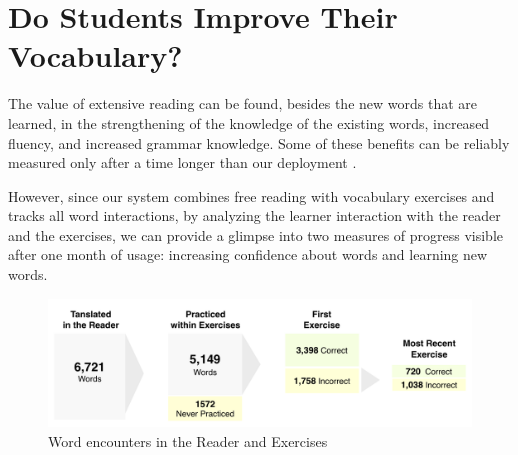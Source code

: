 
\newpage
\section{Do Students Improve Their Vocabulary?}

  The value of extensive reading can be found, besides the new words that are learned, in the strengthening of the knowledge of the existing words, increased fluency, and increased grammar knowledge. Some of these benefits can be reliably measured only after a time longer than our deployment \cite{renadya07-power}. 

  However, since our system combines free reading with vocabulary exercises and tracks all word interactions, by analyzing the learner interaction with the reader and the exercises, we can provide a glimpse into two measures of progress visible after one month of usage: increasing confidence about words and learning new words. 

   \begin{figure}[h!]
  \centering
    \includegraphics[width=0.8\columnwidth,trim={0 10 0 15},clip]{figures/word-learning-flow.pdf}
    \caption{Word encounters in the Reader and Exercises}
    \label{fig:word_learning_flow}
  \end{figure}


